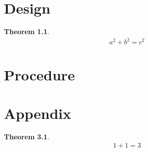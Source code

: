 \documentclass{book}
\newtheorem{mytheorem}{Theorem} %
\begin{document}

{\let\cleardoublepage\relax \frontmatter}
\tableofcontents

\chapter{Design}
\lipsum[1]

\begin{mytheorem} %
\begin{align}
    a^2+b^2=c^2
\end{align}
\end{mytheorem}

\lipsum[2-5]

\chapter{Procedure}

\chapter{Appendix}
\lipsum[6-8]

\begin{mytheorem} %
\begin{align}
   1+1=3
\end{align}
\end{mytheorem}

\lipsum[9]
\end{document}
